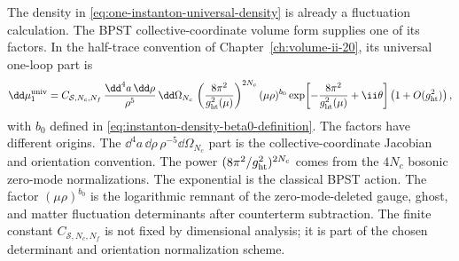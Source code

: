 The density in \eqref{eq:one-instanton-universal-density} is already a
fluctuation calculation.  The BPST collective-coordinate volume form supplies
one of its factors.  In the half-trace convention of
Chapter~\ref{ch:volume-ii-20}, its universal one-loop part is
\begin{equation}
  \dd\mu_1^{\rm univ}
  =
  C_{\mathcal S,N_c,N_f}\,
  \frac{\dd^4a\,\dd\rho}{\rho^5}\,
  \dd\Omega_{N_c}\,
  \left(\frac{8\pi^2}{g_{\rm ht}^2(\mu)}\right)^{2N_c}
  (\mu\rho)^{b_0}
  \exp\!\left[-\frac{8\pi^2}{g_{\rm ht}^2(\mu)}+\ii\theta\right]
  \left(1+O(g_{\rm ht}^2)\right),
  \label{eq:instanton-physical-density-gate-universal}
\end{equation}
with \(b_0\) defined in
\eqref{eq:instanton-density-beta0-definition}.  The factors have different
origins.  The \(\dd^4a\,\dd\rho\,\rho^{-5}\dd\Omega_{N_c}\) part is the
collective-coordinate Jacobian and orientation convention.  The power
\((8\pi^2/g_{\rm ht}^2)^{2N_c}\) comes from the \(4N_c\) bosonic zero-mode
normalizations.  The exponential is the classical BPST action.  The factor
\((\mu\rho)^{b_0}\) is the logarithmic remnant of the zero-mode-deleted
gauge, ghost, and matter fluctuation determinants after counterterm
subtraction.  The finite constant \(C_{\mathcal S,N_c,N_f}\) is not fixed by
dimensional analysis; it is part of the chosen determinant and orientation
normalization scheme.

